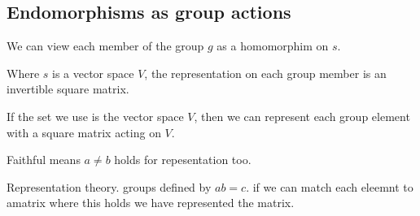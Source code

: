 
\subsection{Endomorphisms as group actions}

We can view each member of the group \(g\) as a homomorphim on \(s\).

Where \(s\) is a vector space \(V\), the representation on each group member is an invertible square matrix.

If the set we use is the vector space \(V\), then we can represent each group element with a square matrix acting on \(V\).

Faithful means \(a\ne b\) holds for repesentation too.

Representation theory. groups defined by \(ab=c\). if we can match each eleemnt to amatrix where this holds we have represented the matrix.

